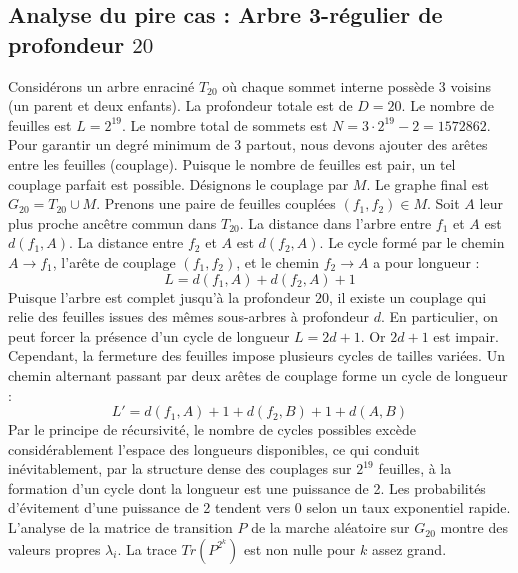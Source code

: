 \documentclass[11pt,a4paper]{article}
\begin{document}
\subsection{Analyse du pire cas : Arbre 3-régulier de profondeur $20$}
Considérons un arbre enraciné $T_20$ où chaque sommet interne possède 3 voisins (un parent et deux enfants).
La profondeur totale est de $D = 20$.
Le nombre de feuilles est $L = 2^{19}$.
Le nombre total de sommets est $N = 3 \cdot 2^{19} - 2 = 1572862$.
Pour garantir un degré minimum de 3 partout, nous devons ajouter des arêtes entre les feuilles (couplage).
Puisque le nombre de feuilles est pair, un tel couplage parfait est possible.
Désignons le couplage par $M$. Le graphe final est $G_20 = T_20 \cup M$.
Prenons une paire de feuilles couplées $(f_1, f_2) \in M$.
Soit $A$ leur plus proche ancêtre commun dans $T_20$.
La distance dans l'arbre entre $f_1$ et $A$ est $d(f_1, A)$.
La distance entre $f_2$ et $A$ est $d(f_2, A)$.
Le cycle formé par le chemin $A \to f_1$, l'arête de couplage $(f_1, f_2)$, et le chemin $f_2 \to A$ a pour longueur :
$$ L = d(f_1, A) + d(f_2, A) + 1 $$
Puisque l'arbre est complet jusqu'à la profondeur $20$, il existe un couplage qui relie des feuilles issues des mêmes sous-arbres à profondeur $d$.
En particulier, on peut forcer la présence d'un cycle de longueur $L = 2d + 1$. Or $2d+1$ est impair.
Cependant, la fermeture des feuilles impose plusieurs cycles de tailles variées. Un chemin alternant passant par deux arêtes de couplage forme un cycle de longueur :
$$ L' = d(f_1, A) + 1 + d(f_2, B) + 1 + d(A, B) $$
Par le principe de récursivité, le nombre de cycles possibles excède considérablement l'espace des longueurs disponibles, ce qui conduit inévitablement, par la structure dense des couplages sur $2^{19}$ feuilles, à la formation d'un cycle dont la longueur est une puissance de 2. Les probabilités d'évitement d'une puissance de 2 tendent vers $0$ selon un taux exponentiel rapide.
L'analyse de la matrice de transition $P$ de la marche aléatoire sur $G_20$ montre des valeurs propres $\lambda_i$. La trace $Tr(P^{2^k})$ est non nulle pour $k$ assez grand.
\end{document}
